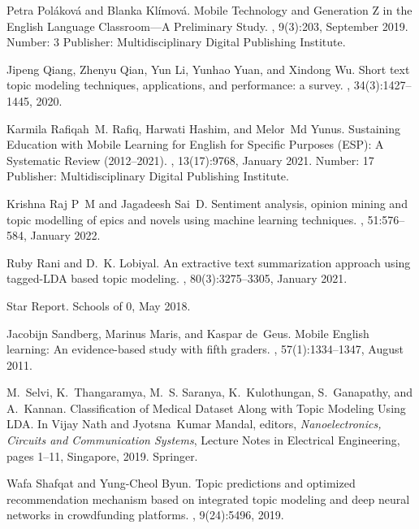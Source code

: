 \begin{thebibliography}{10}
Petra Poláková and Blanka Klímová.
\newblock Mobile {Technology} and {Generation} {Z} in the {English} {Language}
  {Classroom}—{A} {Preliminary} {Study}.
, 9(3):203, September 2019.
\newblock Number: 3 Publisher: Multidisciplinary Digital Publishing Institute.

Jipeng Qiang, Zhenyu Qian, Yun Li, Yunhao Yuan, and Xindong Wu.
\newblock Short text topic modeling techniques, applications, and performance:
  a survey.
,
  34(3):1427--1445, 2020.

Karmila Rafiqah~M. Rafiq, Harwati Hashim, and Melor~Md Yunus.
\newblock Sustaining {Education} with {Mobile} {Learning} for {English} for
  {Specific} {Purposes} ({ESP}): {A} {Systematic} {Review} (2012–2021).
, 13(17):9768, January 2021.
\newblock Number: 17 Publisher: Multidisciplinary Digital Publishing Institute.

Krishna Raj P~M and Jagadeesh Sai~D.
\newblock Sentiment analysis, opinion mining and topic modelling of epics and
  novels using machine learning techniques.
, 51:576--584, January 2022.

Ruby Rani and D.~K. Lobiyal.
\newblock An extractive text summarization approach using tagged-{LDA} based
  topic modeling.
, 80(3):3275--3305, January
  2021.

Star Report.
\newblock Schools of 0, May 2018.

Jacobijn Sandberg, Marinus Maris, and Kaspar de~Geus.
\newblock Mobile {English} learning: {An} evidence-based study with fifth
  graders.
, 57(1):1334--1347, August 2011.

M.~Selvi, K.~Thangaramya, M.~S. Saranya, K.~Kulothungan, S.~Ganapathy, and
  A.~Kannan.
\newblock Classification of {Medical} {Dataset} {Along} with {Topic} {Modeling}
  {Using} {LDA}.
\newblock In Vijay Nath and Jyotsna~Kumar Mandal, editors, {\em
  Nanoelectronics, {Circuits} and {Communication} {Systems}}, Lecture {Notes}
  in {Electrical} {Engineering}, pages 1--11, Singapore, 2019. Springer.

Wafa Shafqat and Yung-Cheol Byun.
\newblock Topic predictions and optimized recommendation mechanism based on
  integrated topic modeling and deep neural networks in crowdfunding platforms.
, 9(24):5496, 2019.


\end{thebibliography}
